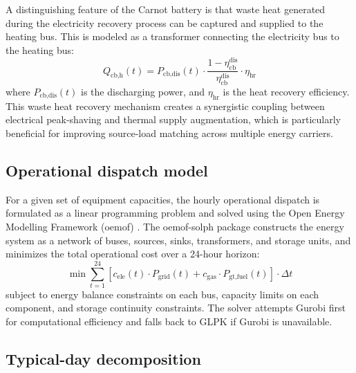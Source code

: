 A distinguishing feature of the Carnot battery is that waste heat generated during the electricity recovery process can be captured and supplied to the heating bus. This is modeled as a transformer connecting the electricity bus to the heating bus:
\begin{equation}
    Q_{\text{cb,h}}(t) = P_{\text{cb,dis}}(t) \cdot \frac{1 - \eta_{\text{cb}}^{\text{dis}}}{\eta_{\text{cb}}^{\text{dis}}} \cdot \eta_{\text{hr}}
    \label{eq:cb_heat}
\end{equation}
where $P_{\text{cb,dis}}(t)$ is the discharging power, and $\eta_{\text{hr}}$ is the heat recovery efficiency. This waste heat recovery mechanism creates a synergistic coupling between electrical peak-shaving and thermal supply augmentation, which is particularly beneficial for improving source-load matching across multiple energy carriers.

\subsection{Operational dispatch model}
\label{sec:dispatch}

For a given set of equipment capacities, the hourly operational dispatch is formulated as a linear programming problem and solved using the Open Energy Modelling Framework (oemof) \cite{hilpert2018oemof}. The oemof-solph package constructs the energy system as a network of buses, sources, sinks, transformers, and storage units, and minimizes the total operational cost over a 24-hour horizon:
\begin{equation}
    \min \sum_{t=1}^{24} \left[ c_{\text{ele}}(t) \cdot P_{\text{grid}}(t) + c_{\text{gas}} \cdot P_{\text{gt,fuel}}(t) \right] \cdot \Delta t
    \label{eq:dispatch}
\end{equation}
subject to energy balance constraints on each bus, capacity limits on each component, and storage continuity constraints. The solver attempts Gurobi first for computational efficiency and falls back to GLPK if Gurobi is unavailable.

\subsection{Typical-day decomposition}
\label{sec:typical_day}

